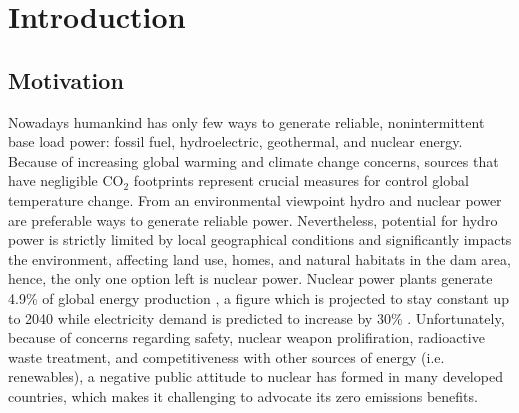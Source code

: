 \chapter[Introduction]{Introduction}

\section{Motivation}

Nowadays humankind has only few ways to generate reliable, nonintermittent base load power: fossil fuel, hydroelectric, geothermal, and nuclear energy. Because of increasing global warming and climate change concerns, sources that have negligible CO$_2$ footprints represent crucial measures for control global temperature change. From an environmental viewpoint hydro and nuclear power are preferable ways to generate reliable power. Nevertheless, potential for hydro power is strictly limited by local geographical conditions and significantly impacts the environment, affecting land use, homes, and natural habitats in the dam area, hence, the only one option left is nuclear power. Nuclear power plants generate 4.9\% of global energy production \cite{noauthor_key_2017}, a figure which is projected to stay constant up to 2040 while electricity demand is predicted to increase by 30\% \cite{noauthor_world_2017}. Unfortunately, because of concerns regarding safety, nuclear weapon prolifiration, radioactive waste treatment, and competitiveness with other sources of energy (i.e. renewables), a negative public attitude to nuclear has formed in many developed countries, which makes it challenging to advocate its zero emissions benefits.

